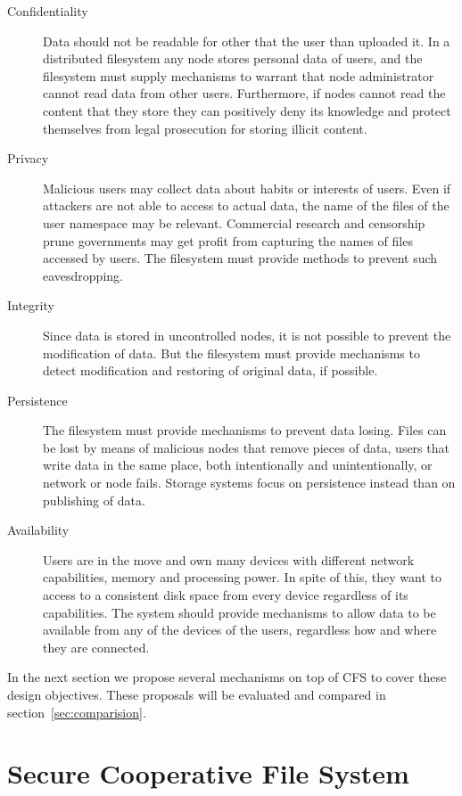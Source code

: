 \documentclass{llncs}
\begin{document}
\begin{description}
 \item[Confidentiality] Data should not be readable for other that the user than uploaded it. In a distributed filesystem any node stores personal data of users, and the filesystem must supply mechanisms to warrant that node administrator cannot read data from other users. Furthermore, if nodes cannot read the content that they store they can positively deny its knowledge and protect themselves from legal prosecution for storing illicit content.
 \item[Privacy] Malicious users may collect data about habits or interests of users. Even if attackers are not able to access to actual data, the name of the files of the user namespace may be relevant. Commercial research and censorship prune governments may get profit from capturing the names of files accessed by users. The filesystem must provide methods to prevent such eavesdropping.
 \item[Integrity] Since data is stored in uncontrolled nodes, it is not possible to prevent the modification of data. But the filesystem must provide mechanisms to detect modification and restoring of original data, if possible.
 \item[Persistence] The filesystem must provide mechanisms to prevent data losing. Files can be lost by means of malicious nodes that remove pieces of data, users that write data in the same place, both intentionally and unintentionally, or network or node fails. Storage systems focus on persistence instead than on publishing of data.
 \item[Availability] Users are in the move and own many devices with different network capabilities, memory and processing power. In spite of this, they want to access to a consistent disk space from every device regardless of its capabilities. The system should provide mechanisms to allow data to be available from any of the devices of the users, regardless how and where they are connected.
\end{description}

In the next section we propose several mechanisms on top of CFS to cover these design objectives. These proposals will be evaluated and compared in section~\ref{sec:comparision}.

\section{Secure Cooperative File System}
\label{sec:scfs}
\end{document}
